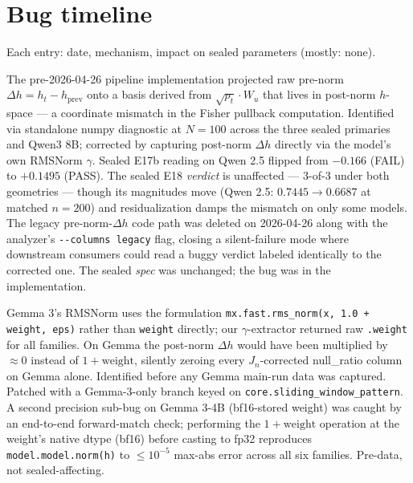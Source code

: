 \documentclass[10pt, letterpaper]{article}
\renewcommand{\dh}{\Delta h}
\newcommand{\Wu}{W_u}
\newcommand{\Jn}{J_n}
\begin{document}
\appendix

\section{Bug timeline}
\label{app:bugs}

Each entry: date, mechanism, impact on sealed parameters (mostly:
none).

\begin{description}[leftmargin=*, itemsep=4pt, topsep=2pt]
  \item[2026-04-25 --- $\Jn$ geometry mismatch in Fisher pullback.]
  The pre-2026-04-26 pipeline implementation projected raw pre-norm
  $\dh = h_t - h_{\text{prev}}$ onto a basis derived from $\sqrt{p_t}
  \cdot \Wu$ that lives in post-norm $h$-space --- a coordinate
  mismatch in the Fisher pullback computation. Identified via
  standalone numpy diagnostic at $N=100$ across the three sealed
  primaries and Qwen3 8B;
  corrected by capturing post-norm $\dh$ directly via the model's own
  RMSNorm $\gamma$. Sealed E17b reading on Qwen 2.5 flipped from
  $-0.166$ (FAIL) to $+0.1495$ (PASS). The sealed E18 \emph{verdict} is
  unaffected --- 3-of-3 under both geometries --- though its magnitudes
  move (Qwen 2.5: $0.7445 \to 0.6687$ at matched $n=200$) and
  residualization damps the mismatch on only some models. The legacy pre-norm-$\dh$ code
  path was deleted on 2026-04-26 along with the analyzer's
  \texttt{-{}-columns legacy} flag, closing a silent-failure mode where
  downstream consumers could read a buggy verdict labeled identically
  to the corrected one. The sealed \emph{spec} was unchanged; the bug
  was in the implementation.

  \item[2026-04-25 --- Gemma 3 RMSNorm $\gamma$ extraction.]
  Gemma 3's RMSNorm uses the formulation \texttt{mx.fast.rms\_norm(x,
  1.0 + weight, eps)} rather than \texttt{weight} directly; our
  $\gamma$-extractor returned raw \texttt{.weight} for all families.
  On Gemma the post-norm $\dh$ would have been multiplied by
  $\approx 0$ instead of $1 + \text{weight}$, silently zeroing every
  $\Jn$-corrected null\_ratio column on Gemma alone. Identified before
  any Gemma main-run data was captured. Patched with a Gemma-3-only
  branch keyed on \texttt{core.sliding\_window\_pattern}. A second
  precision sub-bug on Gemma 3-4B (bf16-stored weight) was caught by
  an end-to-end forward-match check; performing the $1 + \text{weight}$
  operation at the weight's native dtype (bf16) before casting to
  fp32 reproduces \texttt{model.model.norm(h)} to $\leq 10^{-5}$
  max-abs error across all six families. Pre-data, not
  sealed-affecting.


\end{description}
\end{document}
